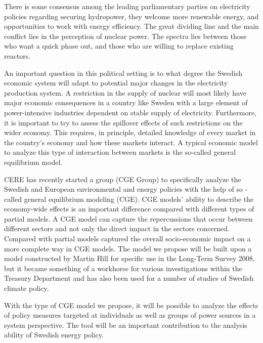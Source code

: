There is some consensus among the leading parliamentary parties on electricity policies regarding securing hydropower, they welcome more renewable energy, and opportunities to work with energy efficiency. The great dividing line and the main conflict lies in the perception of nuclear power. The spectra lies between those who want a quick phase out, and those who are willing to replace existing reactors.

An important question in this political setting is to what degree the Swedish economic system will adapt to potential major changes in the electricity production system. A restriction in the supply of nuclear will most likely have major economic consequences in a country like Sweden with a large element of power-intensive industries dependent on stable supply of electricity. Furthermore, it is important to try to assess the spillover effects of such restrictions on the wider economy. This requires, in principle, detailed knowledge of every market in the country's economy and how these markets interact. A typical economic model to analyze this type of interaction between markets is the so-called general equilibrium model.

CERE has recently started a group (CGE Group) to specifically analyze the Swedish and European environmental and energy policies with the help of so -called general equilibrium modeling (CGE). CGE models' ability to describe the economy-wide effects is an important difference compared with different types of partial models. A CGE model can capture the repercussions that occur between different sectors and not only the direct impact in the sectors concerned. Compared with partial models captured the overall socio-economic impact on a more complete way in CGE models. The model we propose will be built upon a model constructed by Martin Hill for specific use in the Long-Term Survey 2008, but it became something of a workhorse for various investigations within the Treasury Department and has also been used for a number of studies of Swedish climate policy.

With the type of CGE model we propose, it will be possible to analyze the effects of policy measures targeted at individuals as well as groups of power sources in a system perspective. The tool will be an important contribution to the analysis ability of Swedish energy policy.

